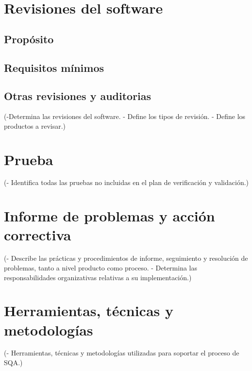 \documentclass[spanish,a4paper,12pt, twoside]{report}	%
\begin{document}
\chapter{ Revisiones del software}
	\section{Propósito}
	\section{Requisitos mínimos}
	\section{Otras revisiones y auditorias}

	(-Determina las revisiones del software.
	- Define los tipos de revisión.
	- Define los productos a revisar.)

\newpage
\mbox{}
\thispagestyle{empty}						%
\newpage

\chapter{ Prueba}
	(- Identifica todas las pruebas no incluidas en el plan
	de verificación y validación.)

\newpage
\mbox{}
\thispagestyle{empty}						%
\newpage

\chapter{ \hspace{0.25cm}Informe de problemas y acción correctiva}
	(- Describe las prácticas y procedimientos de informe,
	seguimiento y resolución de problemas, tanto a nivel	
	producto como proceso.
	- Determina las responsabilidades organizativas
	relativas a su implementación.)

\newpage
\mbox{}
\thispagestyle{empty}						%
\newpage

\chapter{ Herramientas, técnicas y metodologías}
	(- Herramientas, técnicas y metodologías utilizadas
	para soportar el proceso de SQA.)

\newpage
\mbox{}
\thispagestyle{empty}						%
\newpage
\end{document}
